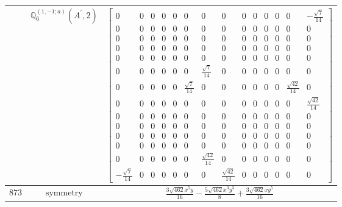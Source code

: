 \documentclass[fleqn,8pt,landscape]{jsarticle}
\begin{document}
\begin{longtable}{ccc}
$  $ & $ \mathbb{Q}_{6}^{(1,-1;a)}(A^{\prime},2) $ & $ \begin{bmatrix} 0 & 0 & 0 & 0 & 0 & 0 & 0 & 0 & 0 & 0 & 0 & 0 & 0 & - \frac{\sqrt{7}}{14} \\ 0 & 0 & 0 & 0 & 0 & 0 & 0 & 0 & 0 & 0 & 0 & 0 & 0 & 0 \\ 0 & 0 & 0 & 0 & 0 & 0 & 0 & 0 & 0 & 0 & 0 & 0 & 0 & 0 \\ 0 & 0 & 0 & 0 & 0 & 0 & 0 & 0 & 0 & 0 & 0 & 0 & 0 & 0 \\ 0 & 0 & 0 & 0 & 0 & 0 & 0 & 0 & 0 & 0 & 0 & 0 & 0 & 0 \\ 0 & 0 & 0 & 0 & 0 & 0 & \frac{\sqrt{7}}{14} & 0 & 0 & 0 & 0 & 0 & 0 & 0 \\ 0 & 0 & 0 & 0 & 0 & \frac{\sqrt{7}}{14} & 0 & 0 & 0 & 0 & 0 & 0 & \frac{\sqrt{42}}{14} & 0 \\ 0 & 0 & 0 & 0 & 0 & 0 & 0 & 0 & 0 & 0 & 0 & 0 & 0 & \frac{\sqrt{42}}{14} \\ 0 & 0 & 0 & 0 & 0 & 0 & 0 & 0 & 0 & 0 & 0 & 0 & 0 & 0 \\ 0 & 0 & 0 & 0 & 0 & 0 & 0 & 0 & 0 & 0 & 0 & 0 & 0 & 0 \\ 0 & 0 & 0 & 0 & 0 & 0 & 0 & 0 & 0 & 0 & 0 & 0 & 0 & 0 \\ 0 & 0 & 0 & 0 & 0 & 0 & 0 & 0 & 0 & 0 & 0 & 0 & 0 & 0 \\ 0 & 0 & 0 & 0 & 0 & 0 & \frac{\sqrt{42}}{14} & 0 & 0 & 0 & 0 & 0 & 0 & 0 \\ - \frac{\sqrt{7}}{14} & 0 & 0 & 0 & 0 & 0 & 0 & \frac{\sqrt{42}}{14} & 0 & 0 & 0 & 0 & 0 & 0 \end{bmatrix} $ \\ \hline
$ 873 $ & $ \text{symmetry} $ & $ \frac{3 \sqrt{462} x^{5} y}{16} - \frac{5 \sqrt{462} x^{3} y^{3}}{8} + \frac{3 \sqrt{462} x y^{5}}{16} $ \\

\end{longtable}
\end{document}
